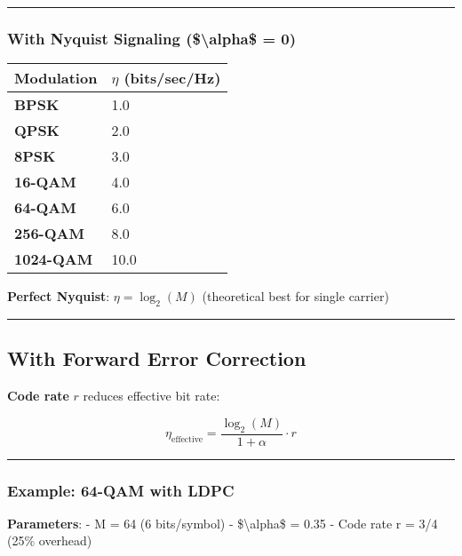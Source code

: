 \begin{center}\rule{0.5\linewidth}{0.5pt}\end{center}

\subsubsection{With Nyquist Signaling (\$\textbackslash alpha\$ =
0)}\label{with-nyquist-signaling-ux3b1-0}

{\def\LTcaptype{} %
\begin{longtable}[]{@{}ll@{}}
\toprule\noalign{}
Modulation & \(\eta\) (bits/sec/Hz) \\
\midrule\noalign{}
\endhead
\bottomrule\noalign{}
\endlastfoot
\textbf{BPSK} & 1.0 \\
\textbf{QPSK} & 2.0 \\
\textbf{8PSK} & 3.0 \\
\textbf{16-QAM} & 4.0 \\
\textbf{64-QAM} & 6.0 \\
\textbf{256-QAM} & 8.0 \\
\textbf{1024-QAM} & 10.0 \\
\end{longtable}
}

\textbf{Perfect Nyquist}: \(\eta = \log_2(M)\) (theoretical best for
single carrier)

\begin{center}\rule{0.5\linewidth}{0.5pt}\end{center}

\subsection{With Forward Error
Correction}\label{with-forward-error-correction}

\textbf{Code rate} \(r\) reduces effective bit rate:

\[
\eta_{\text{effective}} = \frac{\log_2(M)}{1 + \alpha} \cdot r
\]

\begin{center}\rule{0.5\linewidth}{0.5pt}\end{center}

\subsubsection{Example: 64-QAM with
LDPC}\label{example-64-qam-with-ldpc}

\textbf{Parameters}: - M = 64 (6 bits/symbol) - \$\textbackslash alpha\$
= 0.35 - Code rate r = 3/4 (25\% overhead)


